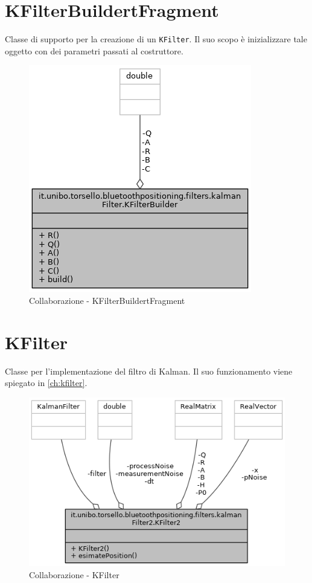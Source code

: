 \section{KFilterBuildertFragment}
Classe di supporto per la creazione di un \texttt{KFilter}. Il suo scopo è inizializzare tale oggetto con dei parametri passati al costruttore.
\begin{figure}[ph]
	\centering
	\includegraphics[width=0.6\linewidth]{img/uml/class/classit_1_1unibo_1_1torsello_1_1bluetoothpositioning_1_1filters_1_1kalmanFilter_1_1KFilterBuilder__coll__graph.png}
	\caption{Collaborazione - KFilterBuildertFragment}
\end{figure}

\newpage
\section{KFilter}

Classe per l'implementazione del filtro di Kalman. Il suo funzionamento viene spiegato in \ref{ch:kfilter}.

\begin{figure}[ph]
	\centering
	\includegraphics[width=0.8\linewidth]{img/uml/class/classit_1_1unibo_1_1torsello_1_1bluetoothpositioning_1_1filters_1_1kalmanFilter2_1_1KFilter2__coll__graph.png}
	\caption{Collaborazione - KFilter}
\end{figure}

